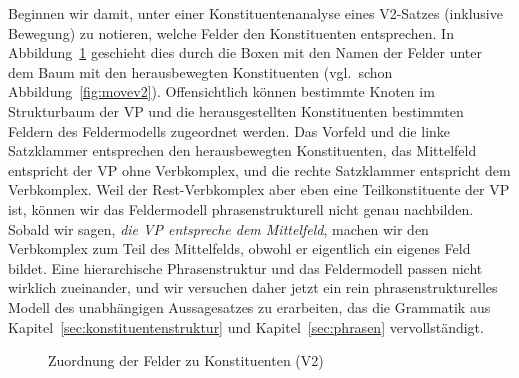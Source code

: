 Beginnen wir damit, unter einer Konstituentenanalyse eines V2-Satzes (inklusive Bewegung) zu notieren, welche Felder den Konstituenten entsprechen.
In Abbildung~\ref{fig:movev2konstituenten} geschieht dies durch die Boxen mit den Namen der Felder unter dem Baum mit den herausbewegten Konstituenten (vgl.\ schon Abbildung~\ref{fig:movev2}).
Offensichtlich können bestimmte Knoten im Strukturbaum der VP und die herausgestellten Konstituenten bestimmten Feldern des Feldermodells zugeordnet werden.
Das Vorfeld und die linke Satzklammer entsprechen den herausbewegten Konstituenten, das Mittelfeld entspricht der VP ohne Verbkomplex, und die rechte Satzklammer entspricht dem Verbkomplex.
Weil der Rest-Verbkomplex aber eben eine Teilkonstituente der VP ist, können wir das Feldermodell phrasenstrukturell nicht genau nachbilden.
Sobald wir sagen, \textit{die VP entspreche dem Mittelfeld}, machen wir den Verbkomplex zum Teil des Mittelfelds, obwohl er eigentlich ein eigenes Feld bildet.
Eine hierarchische Phrasenstruktur und das Feldermodell passen nicht wirklich zueinander, und wir versuchen daher jetzt ein rein phrasenstrukturelles Modell des unabhängigen Aussagesatzes zu erarbeiten, das die Grammatik aus Kapitel~\ref{sec:konstituentenstruktur} und Kapitel~\ref{sec:phrasen} vervollständigt.

\begin{figure}[!htbp]
  \caption{Zuordnung der Felder zu Konstituenten (V2)}
  \label{fig:movev2konstituenten}
\end{figure}

